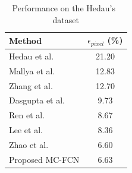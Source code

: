 \begin{table}
	\centering 
	\begin{tabular}{lc}
		\toprule
		Method & $\epsilon_{pixel}$ (\%) \\
		\midrule
		Hedau et al.~\cite{hedau2009recovering} & 21.20 \\
		Mallya et al.~\cite{mallya2015learning} & 12.83 \\
		Zhang et al.~\cite{zhang2017learning} & 12.70 \\
		Dasgupta et al.~\cite{dasgupta2016delay} & 9.73 \\
		Ren et al.~\cite{ren2016coarse} & 8.67 \\
		Lee et al.~\cite{LeeRoomNet17} & 8.36 \\
		Zhao et al.~\cite{zhao2017physics} & 6.60 \\
		\midrule
		Proposed MC-FCN & 6.63 \\
		\bottomrule
	\end{tabular}
	\caption{Performance on the Hedau's~\cite{hedau2009recovering} dataset }
	\label{table:comparison-hedau}
\end{table}



